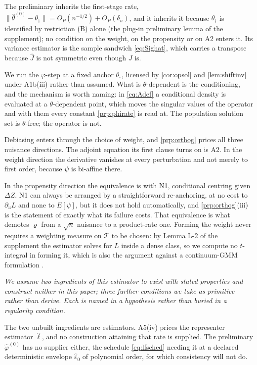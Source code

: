 \documentclass[
  12pt]{article}
\newcommand{\1}[1]{\mathds{1}\left[#1\right]}
\theoremstyle{plain}
\theoremstyle{definition}
\theoremstyle{definition}
\theoremstyle{remark}
\begin{document}
The preliminary inherits the first-stage rate,
\(\|\hat\theta^{(0)}-\theta_\dagger\|=O_P(n^{-1/2})+O_P(\delta_n)\), and
it inherits it because \(\theta_\dagger\) is identified by restriction
(B) alone (the plug-in preliminary lemma of the supplement); no
condition on the weight, on the propensity or on A2 enters it. Its
variance estimator is the sample sandwich \eqref{eq:Sighat}, which
carries a transpose because \(\hat J\) is not symmetric even though
\(J\) is.

We run the \(\varphi\)-step at a fixed anchor \(\theta_\circ\), licensed
by \cref{cor:opsol} and \cref{lem:shiftinv} under A1b(iii) rather than
assumed. What is \(\theta\)-dependent is the conditioning, and the
mechanism is worth naming: in \eqref{eq:Adef} a conditional density is
evaluated at a \(\theta\)-dependent point, which moves the singular
values of the operator and with them every constant \cref{prp:phirate}
is read at. The population solution set is \(\theta\)-free; the operator
is not.

Debiasing enters through the choice of weight, and \cref{prp:orthog}
prices all three nuisance directions. The adjoint equation its first
clause turns on is A2. In the weight direction the derivative vanishes
at every perturbation and not merely to first order, because \(\psi\) is
bi-affine there.

In the propensity direction the equivalence is with N1, conditional
centring given \(\Delta Z\). N1 can always be arranged by a
straightforward re-anchoring, at no cost to \(\partial_uL\) and none to
\(E[\psi]\), but it does not hold automatically, and
\cref{prp:orthog}(iii) is the statement of exactly what its failure
costs. That equivalence is what demotes \(\varrho\) from a \(\sqrt n\)
nuisance to a product-rate one. Forming the weight never requires a
weighting measure on \(\mathcal T\) to be chosen: by Lemma L-2 of the
supplement the estimator solves for \(L\) inside a dense class, so we
compute no \(t\)-integral in forming it, which is also the argument
against a continuum-GMM formulation \citep{carrascoflorens2000}.

\emph{We assume two ingredients of this estimator to exist with stated
properties and construct neither in this paper; three further conditions
we take as primitive rather than derive. Each is named in a hypothesis
rather than buried in a regularity condition.}

The two unbuilt ingredients are estimators. A5(iv) prices the
representer estimator \(\hat\ell\), and no construction attaining that
rate is supplied. The preliminary \(\hat\varphi^{(0)}\) has no supplier
either, the schedule \eqref{eq:lfsched} needing it at a declared
deterministic envelope \(\hat\varepsilon_0\) of polynomial order, for
which consistency will not do.
\end{document}
